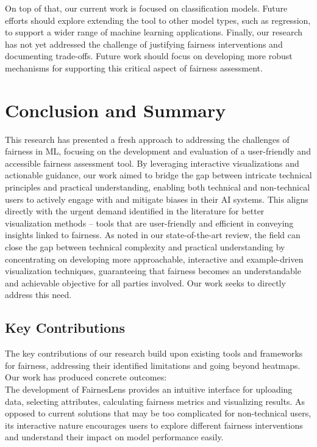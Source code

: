 \documentclass[runningheads]{llncs}
\begin{document}
On top of that, our current work is focused on classification models. Future efforts should explore extending the tool to other model types, such as regression, to support a wider range of machine learning applications.
Finally, our research has not yet addressed the challenge of justifying fairness interventions and documenting trade-offs. Future work should focus on developing more robust mechanisms for supporting this critical aspect of fairness assessment.

\section{Conclusion and Summary}
This research has presented a fresh approach to addressing the challenges of fairness in ML, focusing on the development and evaluation of a user-friendly and accessible fairness assessment tool. By leveraging interactive visualizations and actionable guidance, our work aimed to bridge the gap between intricate technical principles and practical understanding, enabling both technical and non-technical users to actively engage with and mitigate biases in their AI systems. This aligns directly with the urgent demand identified in the literature for better visualization methods – tools that are user-friendly and efficient in conveying insights linked to fairness. As noted in our state-of-the-art review, the field can close the gap between technical complexity and practical understanding by concentrating on developing more approachable, interactive and example-driven visualization techniques, guaranteeing that fairness becomes an understandable and achievable objective for all parties involved. Our work seeks to directly address this need.

\subsection{Key Contributions}
The key contributions of our research build upon existing tools and frameworks for fairness, addressing their identified limitations and going beyond heatmaps. Our work has produced concrete outcomes:\\

The development of FairnesLens provides an intuitive interface for uploading data, selecting attributes, calculating fairness metrics and visualizing results. As opposed to current solutions that may be too complicated for non-technical users, its interactive nature encourages users to explore different fairness interventions and understand their impact on model performance easily.\\
\end{document}
